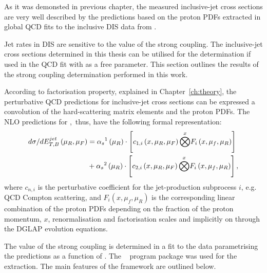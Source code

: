 As it was demonsted in previous chapter, the measured inclusive-jet cross sections are very well described by the predictions based on the proton PDFs extracted in global QCD fits to the inclusive DIS data from \hera. 

Jet rates in DIS are sensitive to the value of the strong coupling. The inclusive-jet cross sections determined in this thesis can be utilised for the \as determination if used in the QCD fit with \as as a free parameter. This section outlines the results of the strong coupling determination performed in this work.

According to factorisation property, explained in Chapter~\ref{ch:theory}, the perturbative QCD predictions for inclusive-jet cross sections can be expressed a convolution of the hard-scattering matrix elements and the proton PDFs. The NLO predictions for \dsdetjetb,~thus, have the following formal representation:
\begin{equation}
	\begin{split}
\mbox{$d\sigma/dE_{T,B}^{jet}$}\left( \mu_R, \mu_F\right) &= \mbox{$\alpha_{s}$}^1\left( \mu_R\right) \cdot \left[ c_{1,i}\left( x, \mu_R, \mu_F\right) \overset{x}{\bigotimes } F_i\left( x, \mu_f, \mu_R \right) \right] \\
&+ \mbox{$\alpha_{s}$}^2\left( \mu_R\right) \cdot \left[ c_{2,i}\left( x, \mu_R, \mu_F\right) \overset{x}{\bigotimes } F_i\left( x, \mu_f, \mu_R \right) \right],
	\end{split}
\end{equation}
where $c_{n,i}$ is the perturbative coefficient for the jet-production subprocess $i$, e.g. QCD Compton scattering, and $F_i\left( x, \mu_f, \mu_R \right)$ is the corresponding linear combination of the proton PDFs depending on the fraction of the proton momentum, $x$, renormalisation and factorisation scales and implicitly on \as through the DGLAP evolution equations.

The value of the strong coupling is determined in a fit to the data parametrising the predictions as a function of \as. The \herafitter~\cite{Aaron:2009aa,Aaron:2009kv} program package was used for the \as extraction. The main features of the \herafitter framework are outlined below.

